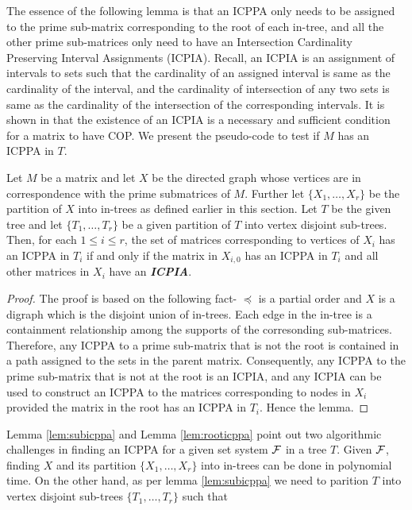 \documentclass[MS]             %
              {iitmdiss_as}    %
\begin{document}
The essence of the following lemma is that an ICPPA only needs to be
assigned to the prime sub-matrix corresponding to the root of each
in-tree, and all the other prime sub-matrices only need to have an
Intersection Cardinality Preserving Interval Assignments (ICPIA).
Recall, an ICPIA is an assignment of intervals to sets such that the
cardinality of an assigned interval is same as the cardinality of the
interval, and the cardinality of intersection of any two sets is same
as the cardinality of the intersection of the corresponding intervals.
It is shown in \cite{nsnrs09} that the existence of an ICPIA is a
necessary and sufficient condition for a matrix to have COP.  We
present the pseudo-code to test if $M$ has an ICPPA in $T$.
\begin{lemma} \label{lem:rooticppa} Let $M$ be a matrix and let $X$ be
  the directed graph whose vertices are in correspondence with the
  prime submatrices of $M$.  Further let $\{X_1,\ldots,X_r\}$ be the
  partition of $X$ into in-trees as defined earlier in this section.
  Let $T$ be the given tree and let $\{T_1, \ldots, T_r\}$ be a given
  partition of $T$ into vertex disjoint sub-trees.  Then, for each $1
  \leq i \leq r$, the set of matrices corresponding to vertices of
  $X_i$ has an ICPPA in $T_i$ if and only if the matrix in $X_{i,0}$
  has an ICPPA in $T_i$ and all other matrices in $X_i$ have an {\bf
    {\em ICPIA}}.
\end{lemma}
\begin{proof}
  The proof is based on the following fact- $\preccurlyeq$ is a
  partial order and $X$ is a digraph which is the disjoint union of
  in-trees.  Each edge in the in-tree is a containment relationship
  among the supports of the corresonding sub-matrices. Therefore, any
  ICPPA to a prime sub-matrix that is not the root is contained in a
  path assigned to the sets in the parent matrix.  Consequently, any
  ICPPA to the prime sub-matrix that is not at the root is an ICPIA,
  and any ICPIA can be used to construct an ICPPA to the matrices
  corresponding to nodes in $X_i$ provided the matrix in the root has
  an ICPPA in $T_i$.  Hence the lemma.
\end{proof}
Lemma \ref{lem:subicppa} and Lemma \ref{lem:rooticppa} point out two
algorithmic challenges in finding an ICPPA for a given set system
${\cal F}$ in a tree $T$.  Given ${\cal F}$, finding $X$ and its partition
$\{X_1,\ldots,X_r\}$ into in-trees can be done in polynomial time.  On
the other hand, as per lemma \ref{lem:subicppa} we need to parition
$T$ into vertex disjoint sub-trees $\{T_1, \ldots, T_r\}$ such that
\end{document}
